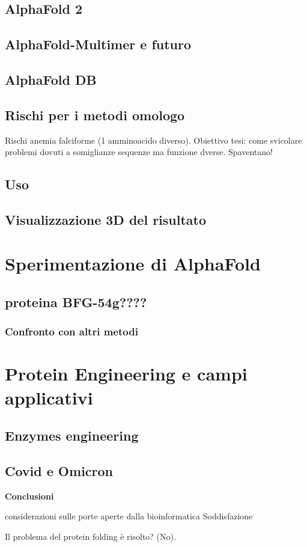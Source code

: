 \section{AlphaFold 2}
\section{AlphaFold-Multimer e futuro}
\section{AlphaFold DB}



\section{Rischi per i metodi omologo}
Rischi anemia falciforme (1 amminoacido diverso).
Obiettivo tesi: come svicolare problemi dovuti a somiglianze sequenze ma funzione dverse. Spaventano! 
\section{Uso}
\section{Visualizzazione 3D del risultato}

\chapter{Sperimentazione di AlphaFold}
\section{proteina BFG-54g????}
\subsection{Confronto con altri metodi}

\chapter{Protein Engineering e campi applicativi}
\section{Enzymes engineering}
\section{Covid e Omicron}


\textbf{{\LARGE Conclusioni}}
\vspace{1cm}

considerazioni sulle porte aperte dalla bioinformatica
Soddisfazione

Il problema del protein folding è risolto? (No).

